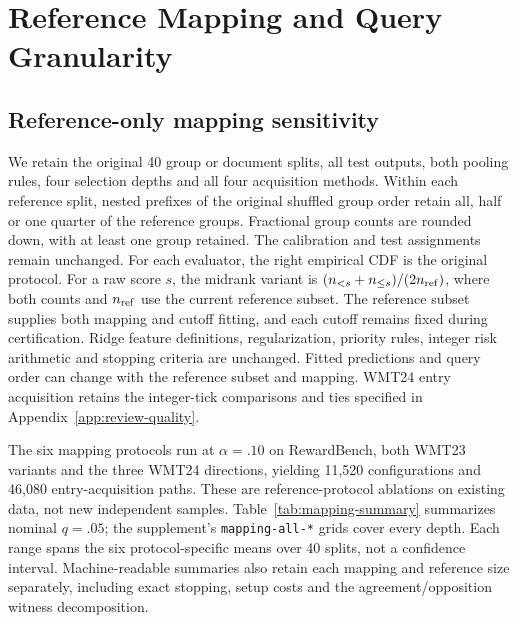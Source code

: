 \section{Reference Mapping and Query Granularity}
\label{app:mapping-column}
\subsection{Reference-only mapping sensitivity}
We retain the original 40 group or document splits, all test outputs, both pooling rules, four selection depths and all four acquisition methods. Within each reference split, nested prefixes of the original shuffled group order retain all, half or one quarter of the reference groups. Fractional group counts are rounded down, with at least one group retained. The calibration and test assignments remain unchanged. For each evaluator, the right empirical CDF is the original protocol. For a raw score $s$, the midrank variant is $(n_{<s}+n_{\le s})/(2n_{\rm ref})$, where both counts and $n_{\rm ref}$ use the current reference subset. The reference subset supplies both mapping and cutoff fitting, and each cutoff remains fixed during certification. Ridge feature definitions, regularization, priority rules, integer risk arithmetic and stopping criteria are unchanged. Fitted predictions and query order can change with the reference subset and mapping. WMT24 entry acquisition retains the integer-tick comparisons and ties specified in Appendix~\ref{app:review-quality}.

The six mapping protocols run at $\alpha=.10$ on RewardBench, both WMT23 variants and the three WMT24 directions, yielding 11,520 configurations and 46,080 entry-acquisition paths. These are reference-protocol ablations on existing data, not new independent samples. Table~\ref{tab:mapping-summary} summarizes nominal $q=.05$; the supplement's \texttt{mapping-all-*} grids cover every depth. Each range spans the six protocol-specific means over 40 splits, not a confidence interval. Machine-readable summaries also retain each mapping and reference size separately, including exact stopping, setup costs and the agreement/opposition witness decomposition.

